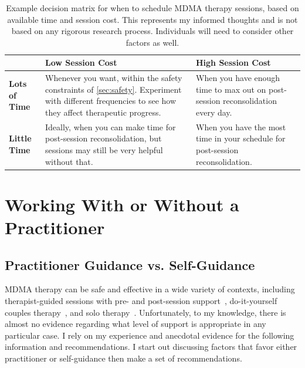 \documentclass[11pt,oneside]{book}
\let\cite\parencite
\begin{document}
\begin{table}[htbp]
\caption{Example decision matrix for when to schedule MDMA therapy sessions, based on available time and session cost. This represents my informed thoughts and is not based on any rigorous research process. Individuals will need to consider other factors as well.}
\label{sessionDecision}
\centering
\begin{tabular}{|>{\raggedright\arraybackslash}p{}|>{\raggedright\arraybackslash}p{}|>{\raggedright\arraybackslash}p{}|}
    \hline
    & \centering\textbf{Low Session Cost} & \centering\textbf{High Session Cost} \tabularnewline
    \hline
    \centering\textbf{Lots of Time} &
    \centering Whenever you want, within the safety constraints of \cref{sec:safety}. Experiment with different frequencies to see how they affect therapeutic progress. &
    \centering When you have enough time to max out on post-session reconsolidation every day. \tabularnewline
    \hline
    \centering\textbf{Little Time} &
    \centering Ideally, when you can make time for post-session reconsolidation, but sessions may still be very helpful without that. &
    \centering When you have the most time in your schedule for post-session reconsolidation. \tabularnewline
    \hline
\end{tabular}
\end{table}
\FloatBarrier

\chapter{Working With or Without a Practitioner}
\section{Practitioner Guidance vs. Self-Guidance}
\label{professionalVSSelf}
MDMA therapy can be safe and effective in a wide variety of contexts, including therapist-guided sessions with pre- and post-session support~\cite{mitchellMDMAClinicalTrial2,mitchellMDMAClinicalTrial}, do-it-yourself couples therapy~\cite{colbertEvenings}, and solo therapy~\cite{hillsSolo}. Unfortunately, to my knowledge, there is almost no evidence regarding what level of support is appropriate in any particular case. I rely on my experience and anecdotal evidence for the following information and recommendations. I start out discussing factors that favor either practitioner or self-guidance then make a set of recommendations.
\end{document}
